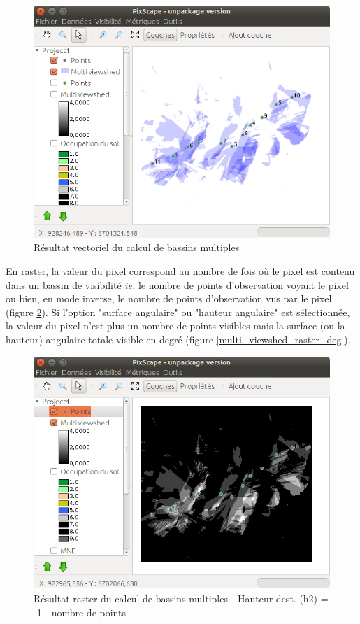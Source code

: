 \documentclass{report}
\begin{document}
\begin{figure}[H]
	\includegraphics[scale=0.5]{img/multi_viewshed_vector-fr.png} 
	\caption{Résultat vectoriel du calcul de bassins multiples}
	\label{multi_viewshed_vector}
\end{figure}

En raster, la valeur du pixel correspond au nombre de fois où le pixel est contenu dans un bassin de visibilité \textit{ie.} le nombre de points d'observation voyant le pixel ou bien, en mode inverse, le nombre de points d'observation vus par le pixel (figure \ref{multi_viewshed_raster}). Si l'option "surface angulaire" ou "hauteur angulaire" est sélectionnée, la valeur du pixel n'est plus un nombre de points visibles mais la surface (ou la hauteur) angulaire totale visible en degré (figure \ref{multi_viewshed_raster_deg}).

\begin{figure}[H]
	\includegraphics[scale=0.5]{img/multi_viewshed_raster-fr.png} 
	\caption{Résultat raster du calcul de bassins multiples - Hauteur dest. (h2) = -1 - nombre de points}
	\label{multi_viewshed_raster}
\end{figure}
\end{document}
